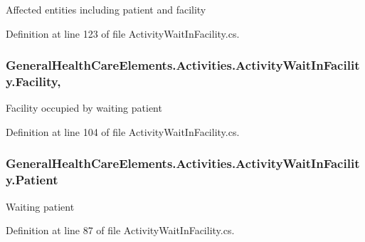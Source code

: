 Affected entities including patient and facility 



Definition at line 123 of file Activity\+Wait\+In\+Facility.\+cs.

\subsubsection[{\texorpdfstring{Facility}{Facility}}]{ General\+Health\+Care\+Elements.\+Activities.\+Activity\+Wait\+In\+Facility.\+Facility\hspace{0.3cm}{\ttfamily [get]}, {\ttfamily [set]}}\hypertarget{class_general_health_care_elements_1_1_activities_1_1_activity_wait_in_facility_ade2d3e1d246d1c9fb6f99b926e5b8370}{}\label{class_general_health_care_elements_1_1_activities_1_1_activity_wait_in_facility_ade2d3e1d246d1c9fb6f99b926e5b8370}


Facility occupied by waiting patient 



Definition at line 104 of file Activity\+Wait\+In\+Facility.\+cs.

\subsubsection[{\texorpdfstring{Patient}{Patient}}]{ General\+Health\+Care\+Elements.\+Activities.\+Activity\+Wait\+In\+Facility.\+Patient\hspace{0.3cm}{\ttfamily [get]}}\hypertarget{class_general_health_care_elements_1_1_activities_1_1_activity_wait_in_facility_a4e6d840e85d112849667e92066eff0d1}{}\label{class_general_health_care_elements_1_1_activities_1_1_activity_wait_in_facility_a4e6d840e85d112849667e92066eff0d1}


Waiting patient 



Definition at line 87 of file Activity\+Wait\+In\+Facility.\+cs.

